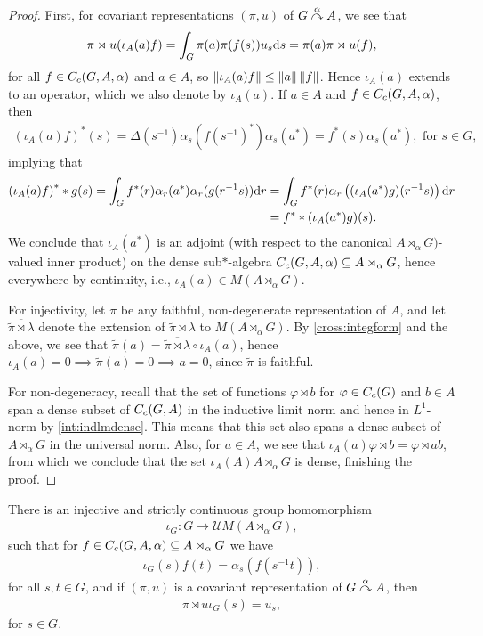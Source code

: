 \begin{proof}
First, for covariant representations $(\pi,u)$ of $G \stackrel{\alpha}{\curvearrowright} A$, we see that
\begin{align*}
\pi \rtimes u(\iota_A(a) f) = \int_G \pi(a) \pi(f(s)) u_s \mathrm{d} s = \pi(a) \pi \rtimes u (f),
\end{align*}
for all $f \in C_c(G,A,\alpha)$ and $a \in A$, so $\left\lVert \iota_A(a) f \right\rVert \leq \left\lVert a \right\rVert \left\lVert f \right\rVert$. Hence $\iota_A(a)$ extends to an operator, which we also denote by $\iota_A(a)$. If $a \in A$ and $f \in C_c(G,A,\alpha)$, then 
\begin{align*}
\left( \iota_A(a) f \right)^*(s) = \Delta(s^{-1}) \alpha_s(f(s^{-1})^*) \alpha_s(a^*) = f^*(s) \alpha_s(a^*), \text{ for }s \in G,
\end{align*}
implying that
\begin{align*}
\left( \iota_A(a) f \right)^* \ast g (s) = \int_G f^*(r) \alpha_r(a^*) \alpha_r(g(r^{-1}s)) \mathrm{d} r &= \int_G f^*(r) \alpha_r \left(  (\iota_A(a^*) g)(r^{-1}s)\right) \mathrm{d} r \\
&= f^* \ast(\iota_A(a^*) g)(s).
\end{align*}
We conclude that $\iota_A(a^*)$ is an adjoint (with respect to the canonical $A \rtimes_\alpha G)$-valued inner product) on the dense sub$*$-algebra $C_c(G,A,\alpha) \subseteq A \rtimes_\alpha G$, hence everywhere by continuity, i.e., $\iota_A(a) \in M(A \rtimes_\alpha G)$. 

For injectivity, let $\pi$ be any faithful, non-degenerate representation of $A$, and let $\overline{\tilde \pi \rtimes \lambda}$ denote the extension of $\tilde \pi \rtimes \lambda$ to $M(A \rtimes_\alpha G)$. By \ref{cross:integform} and the above, we see that $\tilde \pi(a) = \overline{\tilde \pi \rtimes \lambda } \circ \iota_A(a)$, hence $\iota_A(a) = 0 \implies \tilde \pi(a) = 0 \implies a = 0$, since $\tilde \pi$ is faithful.

For non-degeneracy, recall that the set of functions $\varphi \rtimes b$ for $\varphi \in C_c(G)$ and $b \in A $ span a dense subset of $C_c(G,A)$ in the inductive limit norm and hence in $L^1$-norm by \cref{int:indlmdense}. This means that this set also spans a dense subset of $A \rtimes_\alpha G$ in the universal norm. Also, for $a \in A$, we see that $\iota_A(a) \varphi \rtimes b = \varphi \rtimes ab$, from which we conclude that the set $\iota_A(A) A \rtimes_\alpha G$ is dense, finishing the proof.
\end{proof}
\begin{lemma}
There is an injective and strictly continuous group homomorphism
\begin{align*}
	\iota_G \colon G \to \mathcal{U} M(A \rtimes_\alpha G),
\end{align*}
such that for $f \in C_c(G,A,\alpha) \subseteq A \rtimes_\alpha G$ we have
\begin{align*}
	\iota_G(s) f(t) = \alpha_s (f(s^{-1}t)),
\end{align*}
for all $s,t \in G$, and if $(\pi,u)$ is a covariant representation of $G \stackrel{\alpha}{\curvearrowright} A$, then
\begin{align*}
	\overline{\pi \rtimes u} \iota_G(s) =u_s,
\end{align*}
for $s \in G$.
\end{lemma}
